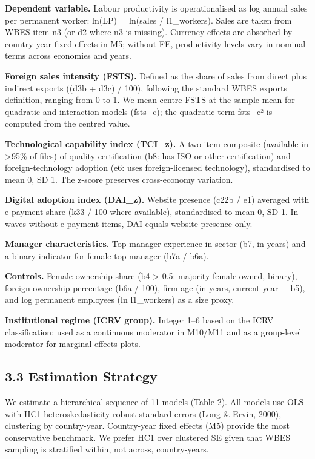 \documentclass[
  12pt]{article}
\begin{document}
\textbf{Dependent variable.} Labour productivity is operationalised as
log annual sales per permanent worker: ln(LP) = ln(sales / l1\_workers).
Sales are taken from WBES item n3 (or d2 where n3 is missing). Currency
effects are absorbed by country-year fixed effects in M5; without FE,
productivity levels vary in nominal terms across economies and years.

\textbf{Foreign sales intensity (FSTS).} Defined as the share of sales
from direct plus indirect exports ((d3b + d3c) / 100), following the
standard WBES exports definition, ranging from 0 to 1. We mean-centre
FSTS at the sample mean for quadratic and interaction models (fsts\_c);
the quadratic term fsts\_c² is computed from the centred value.

\textbf{Technological capability index (TCI\_z).} A two-item composite
(available in \textgreater95\% of files) of quality certification (b8:
has ISO or other certification) and foreign-technology adoption (e6:
uses foreign-licensed technology), standardised to mean 0, SD 1. The
z-score preserves cross-economy variation.

\textbf{Digital adoption index (DAI\_z).} Website presence (c22b / e1)
averaged with e-payment share (k33 / 100 where available), standardised
to mean 0, SD 1. In waves without e-payment items, DAI equals website
presence only.

\textbf{Manager characteristics.} Top manager experience in sector (b7,
in years) and a binary indicator for female top manager (b7a / b6a).

\textbf{Controls.} Female ownership share (b4 \textgreater{} 0.5:
majority female-owned, binary), foreign ownership percentage (b6a /
100), firm age (in years, current year − b5), and log permanent
employees (ln l1\_workers) as a size proxy.

\textbf{Institutional regime (ICRV group).} Integer 1--6 based on the
ICRV classification; used as a continuous moderator in M10/M11 and as a
group-level moderator for marginal effects plots.

\hypertarget{estimation-strategy}{%
\subsection{3.3 Estimation Strategy}\label{estimation-strategy}}

We estimate a hierarchical sequence of 11 models (Table 2). All models
use OLS with HC1 heteroskedasticity-robust standard errors (Long \&
Ervin, 2000), clustering by country-year. Country-year fixed effects
(M5) provide the most conservative benchmark. We prefer HC1 over
clustered SE given that WBES sampling is stratified within, not across,
country-years.
\end{document}
